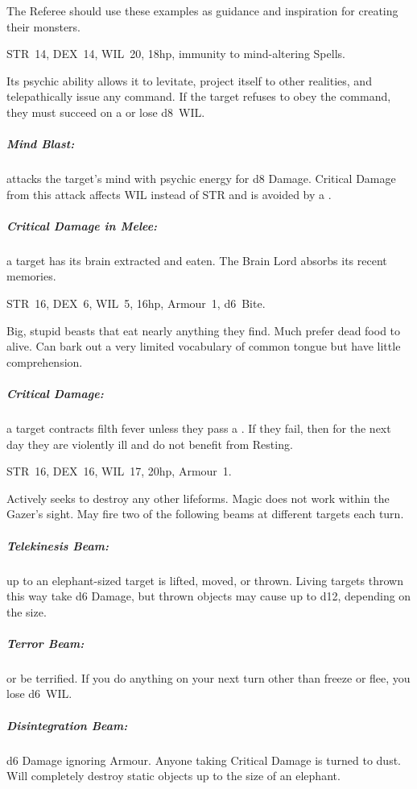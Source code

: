 \documentclass[itdr]{subfiles}
\begin{document}
\label{ch:appendix_b}

The Referee should use these examples as guidance and inspiration for creating their monsters.

\vfill

STR~14, DEX~14, WIL~20, 18hp, immunity to mind-altering Spells.

Its psychic ability allows it to levitate, project itself to other realities, and telepathically issue any command. If the target refuses to obey the command, they must succeed on a  or lose d8~WIL.

\subparagraph{Mind Blast:} attacks the target's mind with psychic energy for d8 Damage. Critical Damage from this attack affects WIL instead of STR and is avoided by a .

\subparagraph{Critical Damage in Melee:} a target has its brain extracted and eaten. The Brain Lord absorbs its recent memories.

\vfill


\vspace{-2ex}

STR~16, DEX~6, WIL~5, 16hp, Armour~1, d6~Bite.

Big, stupid beasts that eat nearly anything they find. Much prefer dead food to alive. Can bark out a very limited vocabulary of common tongue but have little comprehension.

\subparagraph{Critical Damage:} a target contracts filth fever unless they pass a . If they fail, then for the next day they are violently ill and do not benefit from Resting.

\vfill

STR~16, DEX~16, WIL~17, 20hp, Armour~1.

Actively seeks to destroy any other lifeforms. Magic does not work within the Gazer's sight. May fire two of the following beams at different targets
each turn.

\subparagraph{Telekinesis Beam:} up to an elephant-sized target is lifted, moved, or thrown. Living targets thrown this way take d6 Damage, but thrown objects may cause up to d12, depending on the size.

\subparagraph{Terror Beam:}  or be terrified. If you do anything on your next turn other than freeze or flee, you lose d6~WIL.

\subparagraph{Disintegration Beam:} d6 Damage ignoring \mbox{Armour}. Anyone taking Critical Damage is turned to dust. Will completely destroy static objects up to the size of an elephant.
\end{document}

